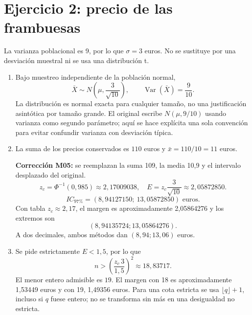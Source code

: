 \documentclass[11pt]{article}
\begin{document}
\section*{Ejercicio 2: precio de las frambuesas}
La varianza poblacional es 9, por lo que $\sigma=3$ euros. No se sustituye por una desviación muestral ni se usa una distribución t.
\begin{enumerate}[label=(\alph*)]
\item Bajo muestreo independiente de la población normal,
\[
\bar X\sim N\left(\mu,\frac{3}{\sqrt{10}}\right),\qquad
\operatorname{Var}(\bar X)=\frac9{10}.
\]
La distribución es normal exacta para cualquier tamaño, no una justificación asintótica por tamaño grande. El original escribe $N(\mu,9/10)$ usando varianza como segundo parámetro; aquí se hace explícita una sola convención para evitar confundir varianza con desviación típica.
\item La suma de los precios conservados es $110$ euros y $\bar x=110/10=\boxed{11}$ euros.

\textbf{Corrección M05:} se reemplazan la suma 109, la media 10,9 y el intervalo desplazado del original.
\[
z_c=\Phi^{-1}(0,985)\approx2,17009038,\quad
E=z_c\frac3{\sqrt{10}}\approx2,05872850.
\]
\[
IC_{97\%}=\boxed{(8,94127150;\ 13,05872850)}\text{ euros}.
\]
Con tabla $z_c\approx2,17$, el margen es aproximadamente 2,05864276 y los extremos son
\[ (8,94135724;13,05864276). \]
A dos decimales, ambos métodos dan $(8,94;13,06)$ euros.
\item Se pide estrictamente $E<1,5$, por lo que
\[
n>\left(\frac{z_c\,3}{1,5}\right)^2\approx18,83717.
\]
El menor entero admisible es $\boxed{19}$. El margen con 18 es aproximadamente 1,53449 euros y con 19, 1,49356 euros. Para una cota estricta se usa $\lfloor q\rfloor+1$, incluso si $q$ fuese entero; no se transforma sin más en una desigualdad no estricta.
\end{enumerate}
\clearpage
\end{document}
